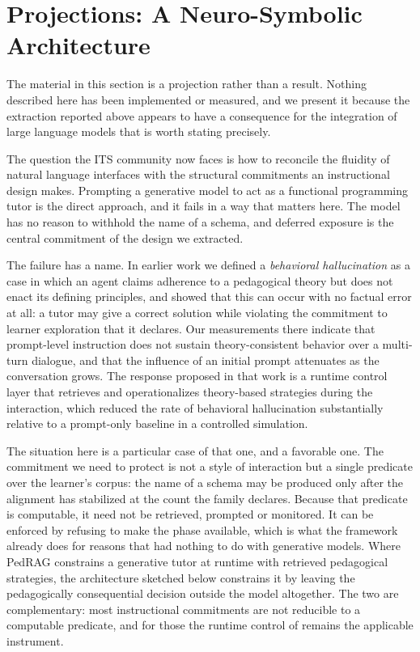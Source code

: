\documentclass[journal]{IEEEtran}
\begin{document}
\section{Projections: A Neuro-Symbolic Architecture}\label{sec:10}
The material in this section is a projection rather than a result. Nothing described here has been implemented or measured, and we present it because the extraction reported above appears to have a consequence for the integration of large language models that is worth stating precisely.

The question the ITS community now faces is how to reconcile the fluidity of natural language interfaces with the structural commitments an instructional design makes. Prompting a generative model to act as a functional programming tutor is the direct approach, and it fails in a way that matters here. The model has no reason to withhold the name of a schema, and deferred exposure is the central commitment of the design we extracted.

The failure has a name. In earlier work \cite{b22} we defined a \emph{behavioral hallucination} as a case in which an agent claims adherence to a pedagogical theory but does not enact its defining principles, and showed that this can occur with no factual error at all: a tutor may give a correct solution while violating the commitment to learner exploration that it declares. Our measurements there indicate that prompt-level instruction does not sustain theory-consistent behavior over a multi-turn dialogue, and that the influence of an initial prompt attenuates as the conversation grows. The response proposed in that work is a runtime control layer that retrieves and operationalizes theory-based strategies during the interaction, which reduced the rate of behavioral hallucination substantially relative to a prompt-only baseline in a controlled simulation.

The situation here is a particular case of that one, and a favorable one. The commitment we need to protect is not a style of interaction but a single predicate over the learner's corpus: the name of a schema may be produced only after the alignment has stabilized at the count the family declares. Because that predicate is computable, it need not be retrieved, prompted or monitored. It can be enforced by refusing to make the phase available, which is what the framework already does for reasons that had nothing to do with generative models. Where PedRAG constrains a generative tutor at runtime with retrieved pedagogical strategies, the architecture sketched below constrains it by leaving the pedagogically consequential decision outside the model altogether. The two are complementary: most instructional commitments are not reducible to a computable predicate, and for those the runtime control of \cite{b22} remains the applicable instrument.
\end{document}
